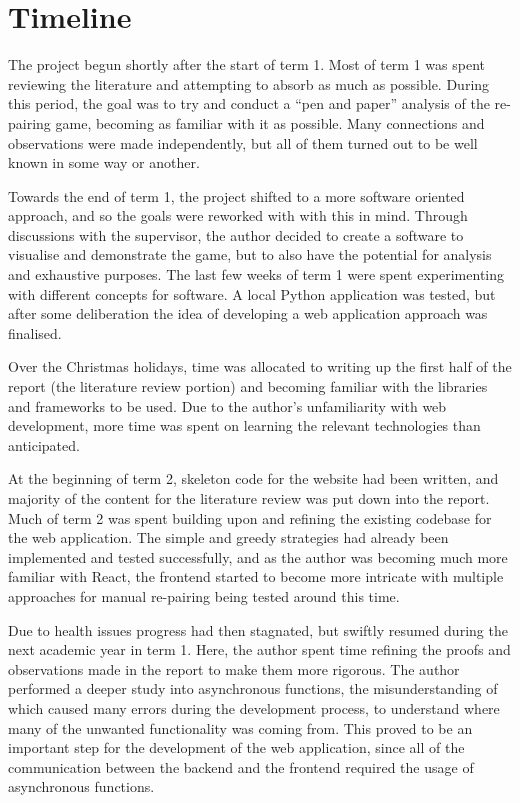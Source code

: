 \section{Timeline}

The project begun shortly after the start of term 1. Most of term 1 was spent reviewing the literature and attempting to absorb as much as possible. During this period, the goal was to try and conduct a ``pen and paper'' analysis of the re-pairing game, becoming as familiar with it as possible. Many connections and observations were made independently, but all of them turned out to be well known in some way or another. 

Towards the end of term 1, the project shifted to a more software oriented approach, and so the goals were reworked with with this in mind. Through discussions with the supervisor, the author decided to create a software to visualise and demonstrate the game, but to also have the potential for analysis and exhaustive purposes. The last few weeks of term 1 were spent experimenting with different concepts for software. A local Python application was tested, but after some deliberation the idea of developing a web application approach was finalised. 

Over the Christmas holidays, time was allocated to writing up the first half of the report (the literature review portion) and becoming familiar with the libraries and frameworks to be used. Due to the author's unfamiliarity with web development, more time was spent on learning the relevant technologies than anticipated. 

At the beginning of term 2, skeleton code for the website had been written, and majority of the content for the literature review was put down into the report. Much of term 2 was spent building upon and refining the existing codebase for the web application. The simple and greedy strategies had already been implemented and tested successfully, and as the author was becoming much more familiar with React, the frontend started to become more intricate with multiple approaches for manual re-pairing being tested around this time. 

Due to health issues progress had then stagnated, but swiftly resumed during the next academic year in term 1. Here, the author spent time refining the proofs and observations made in the report to make them more rigorous. The author performed a deeper study into asynchronous functions, the misunderstanding of which caused many errors during the development process, to understand where many of the unwanted functionality was coming from. This proved to be an important step for the development of the web application, since all of the communication between the backend and the frontend required the usage of asynchronous functions.

